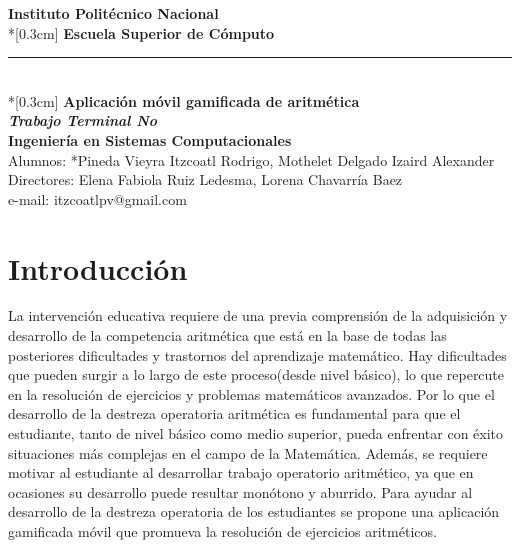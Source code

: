 \documentclass{article}
\begin{document}
\begin{titlepage}


        \begin{center}
            \LARGE \textbf{Instituto Politécnico Nacional}\\*[0.3cm]
            \Large \textbf{Escuela Superior de Cómputo}\\
            \vspace{1cm}
            \rule{12cm}{0.5mm}\\*[0.3cm]%
            \hspace{0.9cm} 
    		\LARGE \textbf{ Aplicación móvil gamificada de aritmética\\}
    		\LARGE \textbf {\emph{Trabajo Terminal No }} 
    		\vspace{1cm} %
    	\LARGE \textbf{\\ Ingeniería en Sistemas Computacionales\\}
    	Alumnos: *Pineda Vieyra Itzcoatl Rodrigo, Mothelet Delgado Izaird Alexander\\
	Directores: Elena Fabiola Ruiz Ledesma, Lorena Chavarría Baez\\
	e-mail: itzcoatlpv@gmail.com
    \vspace{1cm} %
        \end{center}

    \centering %
    \vspace{1cm} %

   	


\end{titlepage}

\tableofcontents
\pagebreak
\section{Introducción}
La intervención educativa requiere de una previa comprensión de la adquisición y desarrollo de la competencia aritmética
que está en la base de todas las posteriores dificultades y trastornos del aprendizaje matemático. Hay dificultades que
pueden surgir a lo largo de este proceso(desde nivel básico), lo que repercute en la resolución de ejercicios y problemas matemáticos avanzados.
Por lo que el desarrollo de la destreza operatoria aritmética es fundamental para que el estudiante, tanto de nivel básico como medio superior, pueda enfrentar con
éxito situaciones más complejas en el campo de la Matemática. Además, se requiere motivar al estudiante al desarrollar
trabajo operatorio aritmético, ya que en ocasiones su desarrollo puede resultar monótono y aburrido. Para ayudar al desarrollo de la destreza operatoria de los estudiantes se propone una aplicación gamificada móvil que promueva la
resolución de ejercicios aritméticos.
\end{document}
